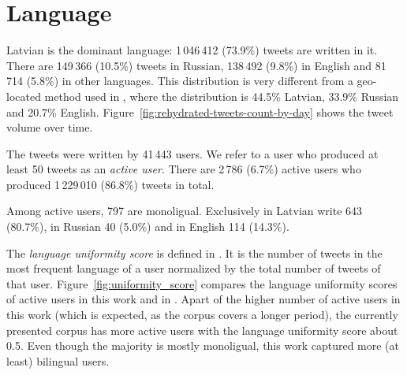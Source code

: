 \documentclass{IOS-Book-Article}
\newcommand{\hl}[1]{#1}
\begin{document}



\section{Language}
\label{sec:language}



Latvian is the dominant language: \hl{1\,046\,412 (73.9\%)} tweets are written in it.\footnotemark{} There are \hl{149\,366 (10.5\%)} tweets in Russian, \hl{138\,492 (9.8\%)} in English and \hl{81\,714 (5.8\%)} in other languages. This distribution is very different from a geo-located method used in \cite{milajevs:2017:BUCC}, where the distribution is 44.5\% Latvian, 33.9\% Russian and 20.7\% English. Figure~\ref{fig:rehydrated-tweets-count-by-day} shows the tweet volume over time.

The tweets were written by \hl{41\,443} users. We refer to a user who produced at least 50 tweets as an \textit{active user}. There are \hl{2\,786} (\hl{6.7\%}) active users who produced \hl{1\,229\,010} (\hl{86.8\%}) tweets in total.

Among active users, \hl{797} are monoligual. Exclusively in Latvian write \hl{643} (\hl{80.7\%}), in Russian \hl{40} (\hl{5.0\%}) and in English \hl{114} (\hl{14.3\%}).

The \textit{language uniformity score} is defined in \cite{milajevs:2017:BUCC}. It is the number of tweets in the most frequent language of a user normalized by the total number of tweets of that user. Figure~\ref{fig:uniformity_score} compares the language uniformity scores of active users in this work and in \cite{milajevs:2017:BUCC}. Apart of the higher number of active users in this work (which is expected, as the corpus covers a longer period), the currently presented corpus has more active users with the language uniformity score about 0.5. Even though the majority is mostly monoligual, this work captured more (at least) bilingual users.
\end{document}
